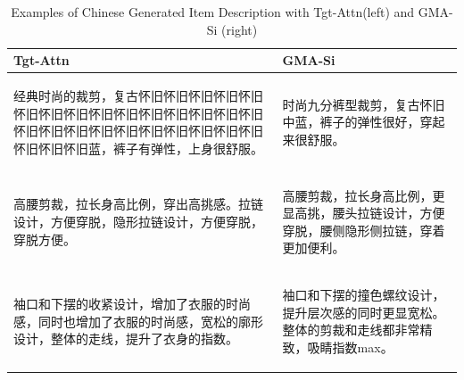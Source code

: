 \documentclass[letterpaper]{article} %
\begin{document}
\begin{table}[]
\centering{}
\renewcommand\arraystretch{1.2}
\small
\vspace{1mm}

\begin{tabular}{|p{}|p{}|}
\hline
Tgt-Attn
 & GMA-Si
\\ \hline
\begin{CJK}{UTF8}{gkai}经典时尚的裁剪，复古怀旧怀旧怀旧怀旧怀旧怀旧怀旧怀旧怀旧怀旧怀旧怀旧怀旧怀旧怀旧怀旧怀旧怀旧怀旧怀旧怀旧怀旧怀旧怀旧怀旧怀旧怀旧怀旧蓝，裤子有弹性，上身很舒服。
\end{CJK} 
 & \begin{CJK}{UTF8}{gkai}时尚九分裤型裁剪，复古怀旧中蓝，裤子的弹性很好，穿起来很舒服。 \end{CJK}                                                            
  \\ \hline
\begin{CJK}{UTF8}{gkai}高腰剪裁，拉长身高比例，穿出高挑感。拉链设计，方便穿脱，隐形拉链设计，方便穿脱，穿脱方便。   \end{CJK}                                                         & 
\begin{CJK}{UTF8}{gkai}高腰剪裁，拉长身高比例，更显高挑，腰头拉链设计，方便穿脱，腰侧隐形侧拉链，穿着更加便利。 \end{CJK}                                                
\\ \hline
\begin{CJK}{UTF8}{gkai}袖口和下摆的收紧设计，增加了衣服的时尚感，同时也增加了衣服的时尚感，宽松的廓形设计，整体的走线，提升了衣身的指数。 \end{CJK}
& 
\begin{CJK}{UTF8}{gkai}袖口和下摆的撞色螺纹设计，提升层次感的同时更显宽松。整体的剪裁和走线都非常精致，吸睛指数max。\end{CJK} 
\\ \hline
\end{tabular}
\caption{Examples of Chinese Generated Item Description with Tgt-Attn(left) and GMA-Si (right)}
\label{tabel: example}
\end{table}
\end{document}
